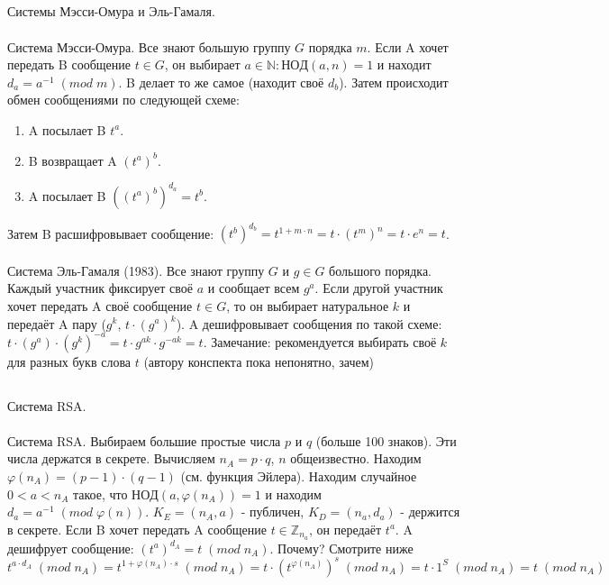 \documentclass[a4paper,10pt]{article} %
\begin{document}
	\subsection{}
	Системы Мэсси-Омура и Эль-Гамаля.
	\\\\
	Система Мэсси-Омура. Все знают большую группу $G$ порядка $m$. Если A хочет передать B сообщение $t \in G$, он выбирает $a \in \mathbb{N}: НОД(a, n) = 1$ и находит $d_{a} = a^{-1} \; (mod \; m)$. B делает то же самое (находит своё $d_{b}$). Затем происходит обмен сообщениями по следующей схеме:
	\begin{enumerate}
		\item A посылает B $t^{a}$.
		\item B возвращает A $(t^{a})^{b}$.
		\item A посылает B $((t^{a})^{b})^{d_{a}} = t^{b}$.
	\end{enumerate}
	Затем B расшифровывает сообщение: $(t^{b})^{d_{b}} = t^{1 + m \cdot n} = t \cdot (t^{m})^n = t \cdot e^{n} = t$.
	\\\\
	Система Эль-Гамаля (1983). Все знают группу $G$ и $g \in G$ большого порядка.
	Каждый участник фиксирует своё $a$ и сообщает всем $g^{a}$. Если другой участник хочет передать A своё сообщение $t \in G$, то он выбирает натуральное $k$ и передаёт A пару ($g^{k}$, $t \cdot (g^{a})^{k}$). A дешифровывает сообщения по такой схеме: $t \cdot (g^{a}) \cdot (g^{k})^{-a} = t \cdot g^{ak} \cdot g^{-ak} = t$. Замечание: рекомендуется выбирать своё $k$ для разных букв слова $t$ (автору конспекта пока непонятно, зачем)
	\subsection{}
	Система RSA. 
	\\\\
	Система RSA. Выбираем большие простые числа $p$ и $q$ (больше 100 знаков). Эти числа держатся в секрете. Вычисляем $n_{A} = p \cdot q$, $n$ общеизвестно. Находим $\varphi(n_{A}) = (p - 1) \cdot (q - 1)$ (см. функция Эйлера). Находим случайное $0 < a < n_{A}$ такое, что $НОД(a, \varphi(n_{A})) = 1$ и находим $d_{a} = a^{-1} \; (mod \; \varphi(n))$. $K_{E} = (n_{A}, a)$ - публичен, $K_{D} = (n_{a}, d_{a})$ - держится в секрете. Если B хочет передать A сообщение $t \in \mathbb{Z}_{n_{a}}$, он передаёт $t^{a}$. A дешифрует сообщение: $(t^{a})^{d_{A}} = t \; (mod \; n_{A})$. Почему? Смотрите ниже
	\begin{equation}
	t^{a \cdot d_{A}} \; (mod \; n_{A}) =
	t^{1 + \varphi(n_{A}) \cdot s} \; (mod \; n_{A}) = 
	t \cdot (t^{\varphi(n_{A})})^s \; (mod \; n_{A}) = 
	t \cdot 1^{S} \; (mod \; n_{A}) = t \; (mod \; n_{A})
	\end{equation}
\end{document}
